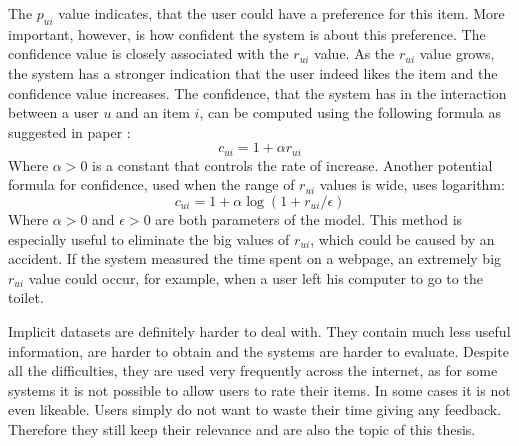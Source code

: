 The $p_{ui}$ value indicates, that the user could have a preference for this item. More important, however, is how confident the system is about this preference. The confidence value is closely associated with the $r_{ui}$ value. As the $r_{ui}$ value grows, the system has a stronger indication that the user indeed likes the item and the confidence value increases. The confidence, that the system has in the interaction between a user $u$ and an item $i$, can be computed using the following formula as suggested in paper \cite{Implicit}:
\begin{equation} \label{eq:lin_conf}
c_{ui} = 1 + \alpha r_{ui}
\end{equation}
Where $\alpha > 0$ is a constant that controls the rate of increase. Another potential formula for confidence, used when the range of $r_{ui}$ values is wide, uses logarithm:
\begin{equation} \label{eq:log_conf}
c_{ui} = 1 + \alpha \log(1 + r_{ui} / \epsilon)
\end{equation}
Where $\alpha>0$ and $\epsilon>0$ are both parameters of the model. This method is especially useful to eliminate the big values of $r_{ui}$, which could be caused by an accident. If the system measured the time spent on a webpage, an extremely big $r_{ui}$ value could occur, for example, when a user left his computer to go to the toilet.

Implicit datasets are definitely harder to deal with. They contain much less useful information, are harder to obtain and the systems are harder to evaluate. Despite all the difficulties, they are used very frequently across the internet, as for some systems it is not possible to allow users to rate their items. In some cases it is not even likeable. Users simply do not want to waste their time giving any feedback. Therefore they still keep their relevance and are also the topic of this thesis. 

